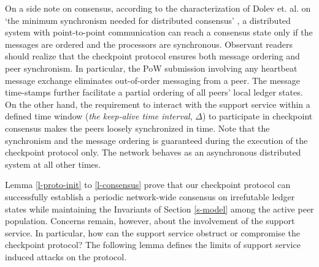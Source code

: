 On a side note on consensus, according to the characterization of Dolev et. al. on `the minimum synchronism needed for distributed consensus' \cite{Dolev:1987:MSN:7531.7533}, a distributed system with point-to-point communication can reach a consensus state only if the messages are ordered and the processors are synchronous. Observant readers should realize that the checkpoint protocol ensures both message ordering and peer synchronism. In particular, the PoW submission involving any heartbeat message exchange eliminates out-of-order messaging from a peer. The message time-stamps further facilitate a partial ordering of all peers' local ledger states. On the other hand, the requirement to interact with the support service within a defined time window (\textit{the keep-alive time interval}, $\Delta$) to participate in checkpoint consensus makes the peers loosely synchronized in time. Note that the synchronism and the message ordering is guaranteed during the execution of the checkpoint protocol only. The network behaves as an asynchronous distributed system at all other times.

Lemma \ref{l-proto-init} to \ref{l-consensus} prove that our checkpoint protocol can successfully establish a periodic network-wide consensus on irrefutable ledger states while maintaining the Invariants of Section \ref{s-model} among the active peer population. Concerns remain, however, about the involvement of the support service. In particular, how can the support service obstruct or compromise the checkpoint protocol? The following lemma defines the limits of support service induced attacks on the protocol.

